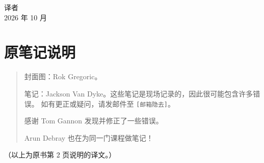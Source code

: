 \vspace{0.6cm}
\begin{flushright}
  译者\\[0.1cm]
  2026 年 10 月
\end{flushright}

\cleardoublepage

\chapter*{原笔记说明}

\begin{quote}
封面图：Rok Gregoric。

笔记：Jackson Van Dyke。这些笔记是现场记录的，因此很可能包含许多错误。
如有更正或疑问，请发邮件至 \texttt{[邮箱隐去]}。

感谢 Tom Gannon 发现并修正了一些错误。

Arun Debray 也在为同一门课程做笔记！
\end{quote}

\vspace{0.5cm}
\noindent（以上为原书第 2 页说明的译文。）

\cleardoublepage

\tableofcontents
\cleardoublepage

\mainmatter



















\appendix



\backmatter



